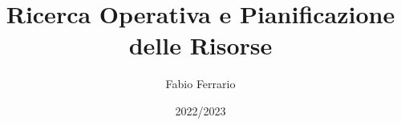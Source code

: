 \documentclass[12pt, a4paper, openany]{book}
\begin{document}
\title{Ricerca Operativa e Pianificazione delle Risorse}
\author{Fabio Ferrario}
\date{2022/2023}
\maketitle

\tableofcontents












\end{document}
